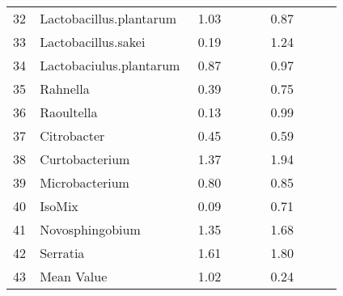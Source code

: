 \begin{longtable}{p{0.06\linewidth} p{0.33\linewidth} p{0.21\linewidth} p{0.21\linewidth}}
  32 & Lactobacillus.plantarum & 1.03 & 0.87 \\ 
  33 & Lactobacillus.sakei & 0.19 & 1.24 \\ 
  34 & Lactobaciulus.plantarum & 0.87 & 0.97 \\ 
  35 & Rahnella & 0.39 & 0.75 \\ 
  36 & Raoultella & 0.13 & 0.99 \\ 
  37 & Citrobacter & 0.45 & 0.59 \\ 
  38 & Curtobacterium & 1.37 & 1.94 \\ 
  39 & Microbacterium & 0.80 & 0.85 \\ 
  40 & IsoMix & 0.09 & 0.71 \\ 
  41 & Novosphingobium & 1.35 & 1.68 \\ 
  42 & Serratia & 1.61 & 1.80 \\ 
  43 & Mean Value & 1.02 & 0.24 \\ 
   \hline
   





\end{longtable}
